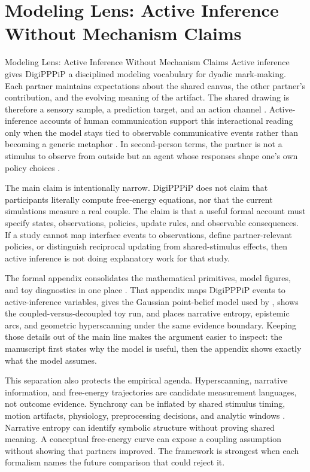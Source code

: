 \documentclass[
  ignorenonframetext,
]{beamer}
\author{\texorpdfstring{}{}}
\date{}
\begin{document}
\section{Modeling Lens: Active Inference Without Mechanism
Claims}\label{sec:active_inference}

\begin{frame}{Modeling Lens: Active Inference
Without Mechanism Claims}
Active inference gives DigiPPPiP a disciplined modeling vocabulary for
dyadic mark-making. Each partner maintains expectations about the shared
canvas, the other partner's contribution, and the evolving meaning of
the artifact. The shared drawing is therefore a sensory sample, a
prediction target, and an action channel . Active-inference accounts of
human communication support this interactional reading only when the
model stays tied to observable communicative events rather than becoming
a generic metaphor . In second-person
terms, the partner is not a stimulus to observe from outside but an
agent whose responses shape one's own policy choices
.

The main claim is intentionally narrow. DigiPPPiP does not claim that
participants literally compute free-energy equations, nor that the
current simulations measure a real couple. The claim is that a useful
formal account must specify states, observations, policies, update
rules, and observable consequences. If a study cannot map interface
events to observations, define partner-relevant policies, or distinguish
reciprocal updating from shared-stimulus effects, then active inference
is not doing explanatory work for that study.

The formal appendix consolidates the mathematical primitives, model
figures, and toy diagnostics in one place
. That appendix maps DigiPPPiP events to
active-inference variables, gives the Gaussian point-belief model used
by , shows the coupled-versus-decoupled
toy run, and places narrative entropy, epistemic arcs, and geometric
hyperscanning under the same evidence boundary. Keeping those details
out of the main line makes the argument easier to inspect: the
manuscript first states why the model is useful, then the appendix shows
exactly what the model assumes.

This separation also protects the empirical agenda. Hyperscanning,
narrative information, and free-energy trajectories are candidate
measurement languages, not outcome evidence. Synchrony can be inflated
by shared stimulus timing, motion artifacts, physiology, preprocessing
decisions, and analytic windows . Narrative
entropy can identify symbolic structure without proving shared meaning.
A conceptual free-energy curve can expose a coupling assumption without
showing that partners improved. The framework is strongest when each
formalism names the future comparison that could reject it.


\end{frame}
\end{document}
